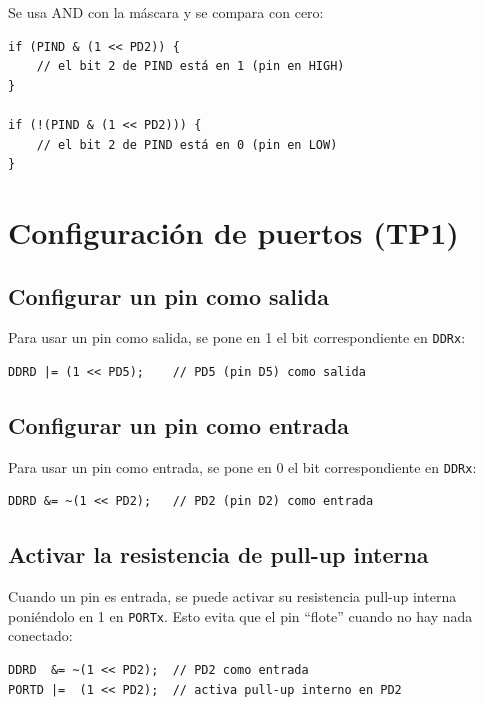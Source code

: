 Se usa AND con la máscara y se compara con cero:

\begin{lstlisting}[style=estilo-c]
if (PIND & (1 << PD2)) {
    // el bit 2 de PIND está en 1 (pin en HIGH)
}

if (!(PIND & (1 << PD2))) {
    // el bit 2 de PIND está en 0 (pin en LOW)
}
\end{lstlisting}

\section{Configuración de puertos (TP1)}

\subsection{Configurar un pin como salida}

Para usar un pin como salida, se pone en 1 el bit correspondiente en \texttt{DDRx}:

\begin{lstlisting}[style=estilo-c]
DDRD |= (1 << PD5);    // PD5 (pin D5) como salida
\end{lstlisting}

\subsection{Configurar un pin como entrada}

Para usar un pin como entrada, se pone en 0 el bit correspondiente en \texttt{DDRx}:

\begin{lstlisting}[style=estilo-c]
DDRD &= ~(1 << PD2);   // PD2 (pin D2) como entrada
\end{lstlisting}

\subsection{Activar la resistencia de pull-up interna}

Cuando un pin es entrada, se puede activar su resistencia pull-up interna
poniéndolo en 1 en \texttt{PORTx}. Esto evita que el pin ``flote'' cuando no hay
nada conectado:

\begin{lstlisting}[style=estilo-c]
DDRD  &= ~(1 << PD2);  // PD2 como entrada
PORTD |=  (1 << PD2);  // activa pull-up interno en PD2
\end{lstlisting}

